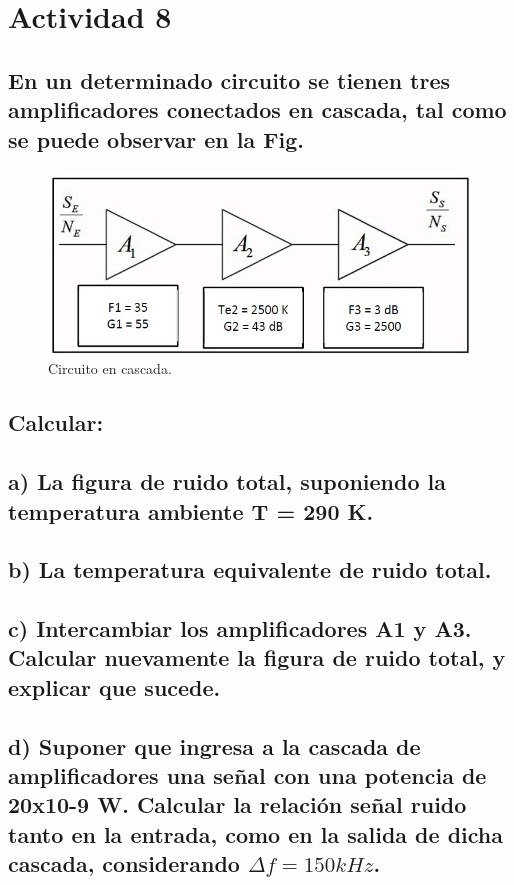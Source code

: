 \section{Actividad 8}

\subsection*{En un determinado circuito se tienen tres amplificadores conectados en cascada, tal
como se puede observar en la Fig. }

    \begin{figure}[H]
        \centering
        \includegraphics[width=0.8\linewidth]{imagenes/Actividad_8/actividad_8.jpg}
        \caption{Circuito en cascada.}
        \label{fig:diagrama_8}
    \end{figure}

\subsection*{Calcular:}

\subsection*{a) La figura de ruido total, suponiendo la temperatura ambiente T = 290 K.}

\subsection*{b) La temperatura equivalente de ruido total.}

\subsection*{c) Intercambiar los amplificadores A1 y A3. Calcular nuevamente la figura de ruido total, y explicar que sucede.}

\subsection*{d) Suponer que ingresa a la cascada de amplificadores una señal con una potencia de 20x10-9 W. Calcular la relación señal ruido 
tanto en la entrada, como en la salida de dicha cascada, considerando $\Delta f = 150 kHz$.}